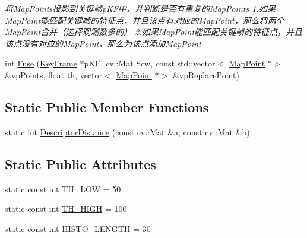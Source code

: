 \begin{DoxyCompactItemize}
\begin{DoxyCompactList}\small\item\em 将\+Map\+Points投影到关键帧p\+K\+F中，并判断是否有重复的\+Map\+Points 1.如果\+Map\+Point能匹配关键帧的特征点，并且该点有对应的\+Map\+Point，那么将两个\+Map\+Point合并（选择观测数多的） 2.如果\+Map\+Point能匹配关键帧的特征点，并且该点没有对应的\+Map\+Point，那么为该点添加\+Map\+Point \end{DoxyCompactList}\item 
int \mbox{\hyperlink{class_o_r_b___s_l_a_m2_1_1_o_r_bmatcher_a16efd376a838e1edf18c04229b86059d}{Fuse}} (\mbox{\hyperlink{class_o_r_b___s_l_a_m2_1_1_key_frame}{Key\+Frame}} $\ast$p\+KF, cv\+::\+Mat Scw, const std\+::vector$<$ \mbox{\hyperlink{class_o_r_b___s_l_a_m2_1_1_map_point}{Map\+Point}} $\ast$$>$ \&vp\+Points, float th, vector$<$ \mbox{\hyperlink{class_o_r_b___s_l_a_m2_1_1_map_point}{Map\+Point}} $\ast$$>$ \&vp\+Replace\+Point)
\end{DoxyCompactItemize}
\subsection*{Static Public Member Functions}
\begin{DoxyCompactItemize}
\item 
static int \mbox{\hyperlink{class_o_r_b___s_l_a_m2_1_1_o_r_bmatcher_a63ff10561753f23220c2bfcea9b599f3}{Descriptor\+Distance}} (const cv\+::\+Mat \&a, const cv\+::\+Mat \&b)
\end{DoxyCompactItemize}
\subsection*{Static Public Attributes}
\begin{DoxyCompactItemize}
\item 
static const int \mbox{\hyperlink{class_o_r_b___s_l_a_m2_1_1_o_r_bmatcher_a810252607722e100efe4c4e941ae00a6}{T\+H\+\_\+\+L\+OW}} = 50
\item 
static const int \mbox{\hyperlink{class_o_r_b___s_l_a_m2_1_1_o_r_bmatcher_aeb28265794388e19763e9a3dabd51473}{T\+H\+\_\+\+H\+I\+GH}} = 100
\item 
static const int \mbox{\hyperlink{class_o_r_b___s_l_a_m2_1_1_o_r_bmatcher_aa2f2d9094b4f31db4f65c93778f71494}{H\+I\+S\+T\+O\+\_\+\+L\+E\+N\+G\+TH}} = 30
\end{DoxyCompactItemize}
